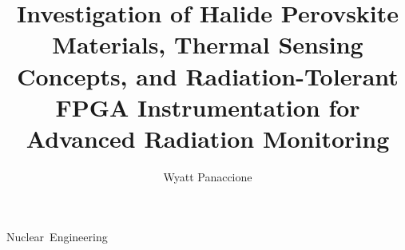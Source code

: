 \documentclass{osudissert96}
\begin{document}
%
%

\author{Wyatt Panaccione}
\title{Investigation of Halide Perovskite Materials, Thermal Sensing Concepts, and Radiation-Tolerant FPGA Instrumentation for Advanced Radiation Monitoring}
\unit{Nuclear Engineering}



%
%

\maketitle

%
%
%
%
%

\disscopyright

%
%

\begin{abstract}
  
\end{abstract}


%
%
%
\end{document}
